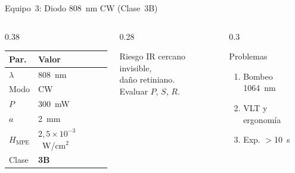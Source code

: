 \documentclass[aspectratio=169,12pt]{beamer}
\begin{document}
\begin{frame}{Equipo~3: Diodo 808~nm CW (Clase~3B)}
	\begin{columns}
		\begin{column}{0.38\textwidth}
			\centering\scriptsize
			\begin{tabular}{ll}
				\toprule
				\textbf{Par.}      & \textbf{Valor}                    \\
				\midrule
				$\lambda$          & 808~nm                            \\
				Modo               & CW                                \\
				$P$                & 300~mW                            \\
				$a$                & 2~mm                              \\
				$H_{\mathrm{MPE}}$ & $2{,}5\!\times\!10^{-3}$~W/cm$^2$ \\
				\rowcolor{aeroyellow!25}
				Clase              & \textbf{3B}                       \\
				\bottomrule
			\end{tabular}
		\end{column}
		\begin{column}{0.28\textwidth}
			\begin{alertblock}{\scriptsize Riesgo}
				\scriptsize
				IR cercano invisible,\\
				daño retiniano.\\
				Evaluar $P$, $S$, $R$.
			\end{alertblock}
		\end{column}
		\begin{column}{0.3\textwidth}
			\begin{exampleblock}{\scriptsize Problemas}
				\scriptsize
				\begin{enumerate}
					\item[P3.1] Bombeo 1064~nm
					\item[P3.2] VLT y ergonomía
					\item[P3.3] Exp. $>$10~s
				\end{enumerate}
			\end{exampleblock}
		\end{column}
	\end{columns}
\end{frame}
\end{document}

